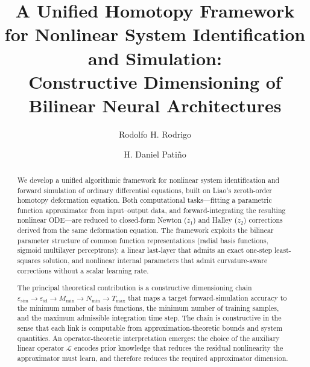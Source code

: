 \documentclass[preprint,12pt,numbers]{elsarticle}
\begin{document}
\begin{frontmatter}

\title{A Unified Homotopy Framework for Nonlinear System Identification and Simulation:\\
Constructive Dimensioning of Bilinear Neural Architectures}

\author[inaut]{Rodolfo H. Rodrigo}

\author[inaut]{H. Daniel Pati\~no}


\begin{abstract}
We develop a unified algorithmic framework for nonlinear system identification
and forward simulation of ordinary differential equations, built on Liao's
zeroth-order homotopy deformation equation. Both computational tasks---fitting
a parametric function approximator from input--output data, and
forward-integrating the resulting nonlinear ODE---are reduced to closed-form
Newton ($z_1$) and Halley ($z_2$) corrections derived from the same deformation
equation. The framework exploits the bilinear parameter structure of common
function representations (radial basis functions, sigmoid multilayer perceptrons):
a linear last-layer that admits an exact one-step least-squares solution, and
nonlinear internal parameters that admit curvature-aware corrections without
a scalar learning rate.

The principal theoretical contribution is a constructive dimensioning chain
$\varepsilon_{\mathrm{sim}} \to \varepsilon_{\mathrm{id}} \to M_{\min} \to N_{\min} \to T_{\max}$
that maps a target forward-simulation accuracy to the minimum number of basis
functions, the minimum number of training samples, and the maximum admissible
integration time step. The chain is constructive in the sense that each link is
computable from approximation-theoretic bounds and system quantities. An operator-theoretic
interpretation emerges: the choice of the auxiliary linear operator $\mathcal{L}$
encodes prior knowledge that reduces the residual nonlinearity the approximator
must learn, and therefore reduces the required approximator dimension.


\end{abstract}
\end{frontmatter}
\end{document}

